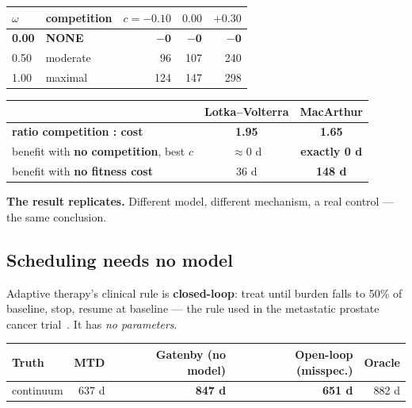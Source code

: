 \documentclass[11pt,a4paper]{article}
\begin{document}
\begin{center}
\begin{tabular}{llrrr}
\toprule
$\omega$ & \textbf{competition} & $c=-0.10$ & $0.00$ & $+0.30$\\
\midrule
\textbf{0.00} & \textbf{NONE} & $\mathbf{-0}$ & $\mathbf{-0}$ & $\mathbf{-0}$\\
0.50 & moderate & 96 & 107 & 240\\
1.00 & maximal & 124 & 147 & 298\\
\bottomrule
\end{tabular}
\end{center}

\begin{center}
\begin{tabular}{lcc}
\toprule
 & \textbf{Lotka--Volterra} & \textbf{MacArthur}\\
\midrule
\textbf{ratio competition : cost} & \textbf{1.95} & \textbf{1.65}\\
benefit with \textbf{no competition}, best $c$ & $\approx 0$ d & \textbf{exactly 0 d}\\
benefit with \textbf{no fitness cost} & 36 d & \textbf{148 d}\\
\bottomrule
\end{tabular}
\end{center}

\textbf{The result replicates.} Different model, different mechanism, a real
control --- the same conclusion.

\subsection{Scheduling needs no model}

Adaptive therapy's clinical rule is \textbf{closed-loop}: treat until burden falls
to 50\% of baseline, stop, resume at baseline --- the rule used in the metastatic
prostate cancer trial~\citep{zhang2017integrating}. It has \emph{no parameters}.

\begin{center}
\begin{tabular}{lrrrr}
\toprule
\textbf{Truth} & \textbf{MTD} & \textbf{Gatenby (no model)} & \textbf{Open-loop (misspec.)} & \textbf{Oracle}\\
\midrule
continuum & 637 d & \textbf{847 d} & \textbf{651 d} & 882 d\\
\bottomrule
\end{tabular}
\end{center}
\end{document}
